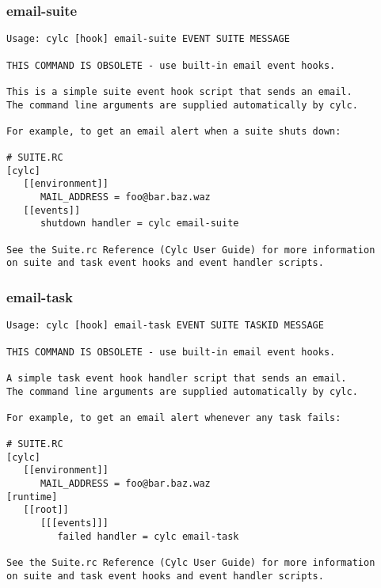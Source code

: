 \subsubsection{email-suite}
\label{email-suite}
\begin{lstlisting}
Usage: cylc [hook] email-suite EVENT SUITE MESSAGE

THIS COMMAND IS OBSOLETE - use built-in email event hooks.

This is a simple suite event hook script that sends an email.
The command line arguments are supplied automatically by cylc.

For example, to get an email alert when a suite shuts down:

# SUITE.RC
[cylc]
   [[environment]]
      MAIL_ADDRESS = foo@bar.baz.waz
   [[events]]
      shutdown handler = cylc email-suite

See the Suite.rc Reference (Cylc User Guide) for more information
on suite and task event hooks and event handler scripts.
\end{lstlisting}
\subsubsection{email-task}
\label{email-task}
\begin{lstlisting}
Usage: cylc [hook] email-task EVENT SUITE TASKID MESSAGE

THIS COMMAND IS OBSOLETE - use built-in email event hooks.

A simple task event hook handler script that sends an email.
The command line arguments are supplied automatically by cylc.

For example, to get an email alert whenever any task fails:

# SUITE.RC
[cylc]
   [[environment]]
      MAIL_ADDRESS = foo@bar.baz.waz
[runtime]
   [[root]]
      [[[events]]]
         failed handler = cylc email-task

See the Suite.rc Reference (Cylc User Guide) for more information
on suite and task event hooks and event handler scripts.
\end{lstlisting}
